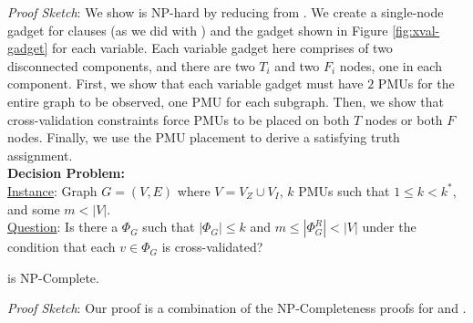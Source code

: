 {\it Proof Sketch}:   We show \xval is NP-hard by reducing from \sats.  
We create a single-node gadget for clauses (as we did with \fulls) and the gadget shown in Figure \ref{fig:xval-gadget} for each variable. Each variable gadget here comprises of two disconnected components, 
and there are two $T_i$ and two $F_i$ nodes, one in each component. First, we show that each variable gadget must have $2$ PMUs for the entire graph to be observed, one PMU for each subgraph.
Then, we show that cross-validation constraints force PMUs to be placed on both $T$ nodes or both $F$ nodes.  Finally, we use the PMU placement to derive a satisfying \sat truth assignment.
\\
{\bf \xvalpart Decision Problem:} \\
\indent \underline{Instance}: Graph $G=(V,E)$ where $V=V_Z \cup V_I$, $k$ PMUs such that $1 \leq k < k^*$, and some $m<|V|$. \\
\indent \underline{Question}: Is there a $\Phi_G$ such that $|\Phi_G| \leq k$ and $m \leq|\Phi^R_G| < |V|$ under the condition that each $v \in \Phi_G$ is cross-validated?

\begin{theorem}
\xvalpart is NP-Complete.
\label{thm:npc-xvalpart}
\end{theorem}

{\it Proof Sketch}:  Our proof is a combination of the NP-Completeness proofs for \maxinc and \xvals.
